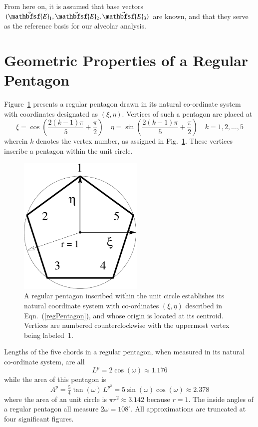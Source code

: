 From here on, it is assumed that base vectors $( \vec{\mathbfsf{E}}_1 , \vec{\mathbfsf{E}}_2 , \vec{\mathbfsf{E}}_3 )$ are known, and that they serve as the reference basis for our alveolar analysis.

\section{Geometric Properties of a Regular Pentagon}

Figure~\ref{figRegPentagon} presents a regular pentagon drawn in its natural co-ordinate system with co\-ordinates designated as $(\xi, \eta)$.  Vertices of such a pentagon are placed at
\begin{equation}
	\xi = \cos \left( \frac{2(k-1)\pi}{5} + \frac{\pi}{2} \right) \quad
	\eta = \sin \left( \frac{2(k-1)\pi}{5} + \frac{\pi}{2} \right) \quad
	k = 1, 2, \ldots, 5
	\label{regPentagon}
\end{equation}
wherein $k$ denotes the vertex number, as assigned in Fig.~\ref{figRegPentagon}.  These vertices inscribe a pentagon within the unit circle.

\begin{figure}
	\centering
	\includegraphics[width=6cm]{figures/regPentagon.pdf}
	\caption{A regular pentagon inscribed within the unit circle establishes its natural co\-ordinate system with co-ordinates $(\xi, \eta)$ described in Eqn.~(\ref{regPentagon}), and whose origin is located at its centroid.  Vertices are numbered counterclockwise with the uppermost vertex being labeled~1.}
	\label{figRegPentagon}
\end{figure}

Lengths of the five chords in a regular pentagon, when measured in its natural co-ordinate system, are all
\begin{equation}
	L^{\!p} = 2 \cos (\omega) \approx 1.176 
	\label{regPentagonLength}
\end{equation}
while the area of this pentagon is
\begin{equation}
	A^p = \tfrac{5}{4} \tan ( \omega ) \, L^{\!p^2} = 
	5 \sin (\omega) \cos (\omega) \approx 2.378
	\label{regPentagonArea}
\end{equation}
where the area of an unit circle is $\pi r^2 \approx 3.142$ because $r=1$.  The
inside angles of a regular pentagon all measure $2\omega = 108^{\circ}$.  All approximations are truncated at four significant figures.

